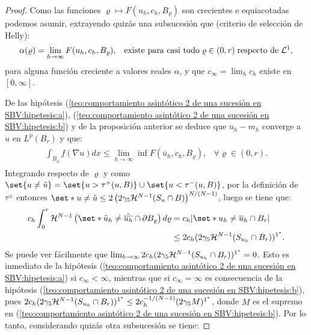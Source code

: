 \documentclass[a4paper,11pt,spanish, twoside, leqno]{tfm-uam}
\begin{document}
\begin{proof}
Como las funciones $\varrho\mapsto F(u_{h}, c_{h}, B_{\varrho})$ son crecientes e equiacotadas podemos asumir, extrayendo quizás una subsucesión que (criterio de selección de Helly):
\begin{align*}
\begin{array}{ll}
\displaystyle \alpha(\varrho)=\lim_{h\to \infty}F(u_{h}, c_{h}, B_{\varrho}), & \text{existe para casi todo}\; \varrho\in(0,r)\;\text{respecto de}\; \mathcal{L}^{1},
\end{array}
\end{align*}
para alguna función creciente a valores reales $\alpha$, y que $c_{\infty}=\lim_{h}c_{h}$ existe en $[0,\infty]$.

De las hipótesis (\ref{teo:comportamiento asintótico 2 de una sucesión en SBV:hipetesis:a}), (\ref{teo:comportamiento asintótico 2 de una sucesión en SBV:hipetesis:b}) y de la proposición anterior se deduce que $\overline{u}_{h}-m_{h}$ converge a $u$ en $L^{p}(B_{r})$ y que:
\begin{align}\label{proof:comportamiento asintótico 2 de una sucesión en SBV:eq:1}
\begin{array}{ll}
\displaystyle
\int_{B_{\varrho}}f(\nabla{u})dx\leq \lim_{h\to \infty}\inf F(\overline{u}_{h},c_{h},B_{\varrho}),& \forall\varrho\in (0,r).
\end{array}
\end{align}
Integrando respecto de $\varrho$ y como $\set{u\not = \tilde{u}}=\set{u>\tau^{+}(u,B)}\cup \set{u<\tau^{-}(u,B)}$, por la definición de $\tau^{\pm}$ entonces $\set*{u\not = \tilde{u}}\leq 2\left (2\gamma_{5}\Hm{N-1}(S_{u}\cap B) \right )^{N/(N-1)}$, luego se tiene que:
\begin{align*}
c_{h}\int^{r}_{0}\Hm{N-1}\left ( \set*{\tilde{u}_{h}\not = \tilde{\overline{u_{h}}}}\cap \partial B_{\varrho}\right ) d\varrho&=c_{h}\abs*{\set*{u_{h}\not = \overline{u}_{h}}\cap B_{r}}
\\&\leq 2c_{h}(2\gamma_{5}\Hm{N-1}(S_{u_{h}}\cap B_{r}))^{1^{*}}.
\end{align*}
Se puede ver fácilmente que $\lim_{h\to \infty}2c_{h}(2\gamma_{5}\mathcal{H}^{N-1}(S_{u_{h}}\cap B_{r}))^{1^{*}}=0$. Esto es inmediato de la hipótesis (\ref{teo:comportamiento asintótico 2 de una sucesión en SBV:hipetesis:a}) si $c_{\infty}<\infty$, mientras que si $c_{\infty}=\infty$ es consecuencia de la hipótesis (\ref{teo:comportamiento asintótico 2 de una sucesión en SBV:hipetesis:b}), pues $2c_{h}(2\gamma_{5}\mathcal{H}^{N-1}(S_{u_{h}}\cap B_{r}))^{1^{*}}\leq 2c_{h}^{-1/(N-1)}(2\gamma_{5}M)^{1^{*}}$, donde $M$ es el supremo en (\ref{teo:comportamiento asintótico 2 de una sucesión en SBV:hipetesis:b}). Por lo tanto, considerando quizás otra subsucesión se tiene:

\end{proof}
\end{document}
